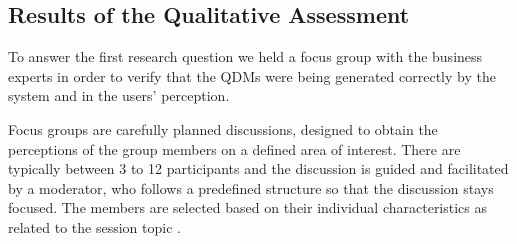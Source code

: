 \documentclass[twocolumn]{bmcart}%
\begin{document}


\subsection{Results of the Qualitative Assessment}


To answer the first research question we held a focus group with the business experts in order to verify that the QDMs were being generated correctly by the system and in the users' perception.

Focus groups are carefully planned discussions, designed to obtain the perceptions of the group members on a defined area of interest. There are typically between 3 to 12 participants and the discussion is guided and facilitated by a moderator, who follows a predefined structure so that the discussion stays focused. The members are selected based on their individual characteristics as related to the session topic \cite{kontio2004using}. 

\end{document}
